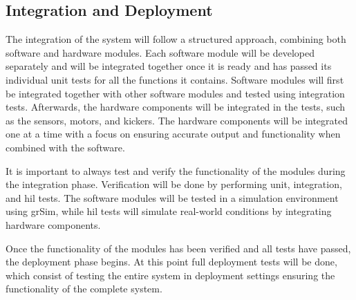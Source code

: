 \subsection{Integration and Deployment}
\label{subsection:integration_and_deployment}

The integration of the system will follow a structured approach, combining both software and hardware modules. 
Each software module will be developed separately and will be integrated together once it is ready and has passed its individual unit tests for all the functions it contains. Software modules will first be integrated together with other software modules and tested using integration tests. Afterwards, the hardware components will be integrated in the tests, such as the sensors, motors, and kickers. The hardware components will be integrated one at a time with a focus on ensuring accurate output and functionality when combined with the software. 

It is important to always test and verify the functionality of the modules during the integration phase. Verification will be done by performing unit, integration, and \ac{hil} tests. 
The software modules will be tested in a simulation environment using grSim, while \ac{hil} tests will simulate real-world conditions by integrating hardware components. 

Once the functionality of the modules has been verified and all tests have passed, the deployment phase begins. At this point full deployment tests will be done, which consist of testing the entire system in deployment settings ensuring the functionality of the complete system.



